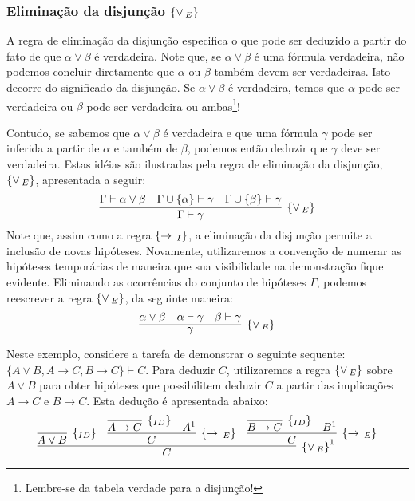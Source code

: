 \subsubsection{Elimina\c{c}\~ao da disjun\c{c}\~ao $\scriptsize{\{\lor\,_{E}\}}$}

A regra de elimina\c{c}\~ao da disjun\c{c}\~ao especifica o que pode
ser deduzido a partir do fato de que $\alpha \lor \beta$ \'e
verdadeira. Note que, se $\alpha\lor \beta$ \'e uma f\'ormula
verdadeira, n\~ao podemos concluir diretamente que $\alpha$ ou $\beta$
tamb\'em devem ser verdadeiras. Isto decorre do significado da
disjun\c{c}\~ao. Se $\alpha \lor \beta$ \'e verdadeira, temos que
$\alpha$ pode ser verdadeira ou $\beta$ pode ser verdadeira ou
ambas\footnote{Lembre-se da tabela verdade para a disjun\c{c}\~ao!}!

Contudo, se sabemos que $\alpha \lor \beta$ \'e verdadeira e que uma
f\'ormula $\gamma$ pode ser inferida a partir de $\alpha$ e tamb\'em
de $\beta$, podemos ent\~ao deduzir que $\gamma$ deve ser verdadeira.
Estas id\'eias s\~ao ilustradas pela regra de elimina\c{c}\~ao da
disjun\c{c}\~ao, $\scriptsize{\{\lor\,_{E}\}}$, apresentada a seguir:
\[
   \infer[\orE]{\Gamma \vdash \gamma}
                    {\Gamma \vdash \alpha \lor \beta &
                      \Gamma\cup\{\alpha\} \vdash \gamma &
                      \Gamma\cup\{\beta\} \vdash \gamma}
\]
Note que, assim como a regra $\scriptsize{\{\to\,_I\}}$, a elimina\c{c}\~ao da
disjun\c{c}\~ao permite a inclus\~ao de novas hip\'oteses. Novamente,
utilizaremos a conven\c{c}\~ao de numerar as hip\'oteses tempor\'arias
de maneira que sua visibilidade na demonstra\c{c}\~ao fique
evidente. Eliminando as ocorr\^encias do conjunto de hip\'oteses
$\Gamma$, podemos reescrever a regra $\scriptsize{\{\lor\,_{E}\}}$, da seguinte maneira:
\[
   \infer[\orE]{\gamma}
                    {\alpha \lor \beta &
                      \alpha \vdash \gamma &
                      \beta \vdash \gamma}
\]
\begin{Example}
Neste exemplo, considere a tarefa de demonstrar o seguinte sequente: $\{A\lor B, A \to C, B\to C\}
\vdash C$. Para deduzir $C$, utilizaremos a regra $\scriptsize{\{\lor\,_{E}\}}$ sobre $A \lor
B$ para obter hip\'oteses que possibilitem deduzir $C$ a partir das
implicações $A\to C$ e $B\to C$. Esta dedução é apresentada abaixo:
\[
    \infer[\orE^1]{C}
                  {\infer[\Id]{A \lor B}{} &
                    \infer[\impE]{C}
                             {
                                \infer[\Id]{A\to C}{} & A^1
                             }
                     &
                     \infer[\impE]{C}
                              {
                                 \infer[\Id]{B\to C}{} & B^1
                              }
                  }
\]
\end{Example}
